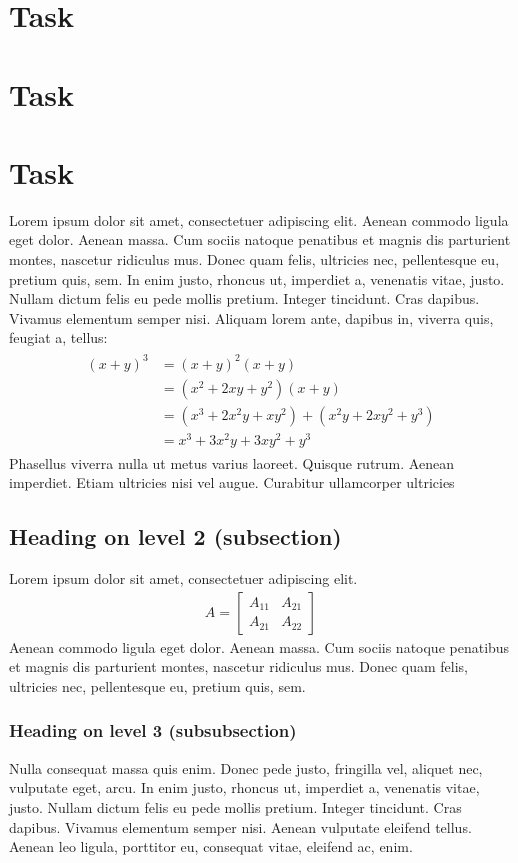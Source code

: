 \documentclass[paper=a4, fontsize=11pt]{scrartcl}
\numberwithin{equation}{section}		%
\numberwithin{figure}{section}			%
\numberwithin{table}{section}				%
\begin{document}
\section{Task}
\section{Task}
\section{Task}

Lorem ipsum dolor sit amet, consectetuer adipiscing elit. Aenean commodo ligula eget dolor. Aenean massa. Cum sociis natoque penatibus et magnis dis parturient montes, nascetur ridiculus mus. Donec quam felis, ultricies nec, pellentesque eu, pretium quis, sem. In enim justo, rhoncus ut, imperdiet a, venenatis vitae, justo. Nullam dictum felis eu pede mollis pretium. Integer tincidunt. Cras dapibus. Vivamus elementum semper nisi. Aliquam lorem ante, dapibus in, viverra quis, feugiat a, tellus:
\begin{align} 
	\begin{split}
	(x+y)^3 	&= (x+y)^2(x+y)\\
					&=(x^2+2xy+y^2)(x+y)\\
					&=(x^3+2x^2y+xy^2) + (x^2y+2xy^2+y^3)\\
					&=x^3+3x^2y+3xy^2+y^3
	\end{split}					
\end{align}
Phasellus viverra nulla ut metus varius laoreet. Quisque rutrum. Aenean imperdiet. Etiam ultricies nisi vel augue. Curabitur ullamcorper ultricies 

\subsection{Heading on level 2 (subsection)}
Lorem ipsum dolor sit amet, consectetuer adipiscing elit. 
\begin{align}
	A = 
	\begin{bmatrix}
	A_{11} & A_{21} \\
  	A_{21} & A_{22}
	\end{bmatrix}
\end{align}
Aenean commodo ligula eget dolor. Aenean massa. Cum sociis natoque penatibus et magnis dis parturient montes, nascetur ridiculus mus. Donec quam felis, ultricies nec, pellentesque eu, pretium quis, sem.

\subsubsection{Heading on level 3 (subsubsection)}
Nulla consequat massa quis enim. Donec pede justo, fringilla vel, aliquet nec, vulputate eget, arcu. In enim justo, rhoncus ut, imperdiet a, venenatis vitae, justo. Nullam dictum felis eu pede mollis pretium. Integer tincidunt. Cras dapibus. Vivamus elementum semper nisi. Aenean vulputate eleifend tellus. Aenean leo ligula, porttitor eu, consequat vitae, eleifend ac, enim.
\end{document}
